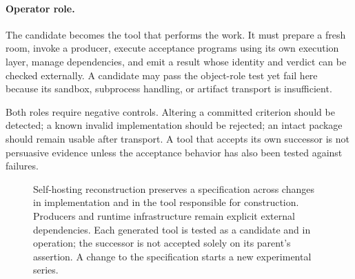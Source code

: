 \documentclass[10pt,twocolumn,letterpaper]{article}
\begin{document}
\paragraph{Operator role.} The candidate becomes the tool that performs the work. It must prepare a fresh room, invoke a producer, execute acceptance programs using its own execution layer, manage dependencies, and emit a result whose identity and verdict can be checked externally. A candidate may pass the object-role test yet fail here because its sandbox, subprocess handling, or artifact transport is insufficient.

Both roles require negative controls. Altering a committed criterion should be detected; a known invalid implementation should be rejected; an intact package should remain usable after transport. A tool that accepts its own successor is not persuasive evidence unless the acceptance behavior has also been tested against failures.

\begin{figure}[t]
\centering
{}
\caption{Self-hosting reconstruction preserves a specification across changes in implementation and in the tool responsible for construction. Producers and runtime infrastructure remain explicit external dependencies. Each generated tool is tested as a candidate and in operation; the successor is not accepted solely on its parent's assertion. A change to the specification starts a new experimental series.}
\label{fig:succession}
\end{figure}
\end{document}
